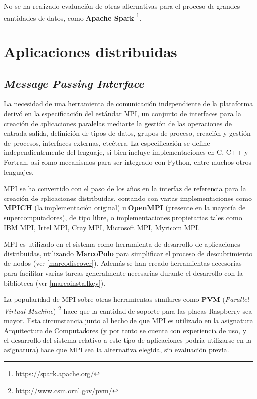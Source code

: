 No se ha realizado evaluación de otras alternativas para el proceso de grandes cantidades de datos, como \textbf{Apache Spark} \footnote{\href{https://spark.apache.org/}{https://spark.apache.org/}}.

\section{Aplicaciones distribuidas}

\subsection{\textit{Message Passing Interface}}

La necesidad de una herramienta de comunicación independiente de la plataforma derivó en la especificación del estándar MPI\cite{MPISpec}, un conjunto de interfaces para la creación de aplicaciones paralelas mediante la gestión de las operaciones de entrada-salida, definición de tipos de datos, grupos de proceso, creación y gestión de procesos, interfaces externas, etcétera. La especificación se define independientemente del lenguaje, si bien incluye implementaciones en C, C++ y Fortran, así como mecanismos para ser integrado con Python, entre muchos otros lenguajes.

MPI se ha convertido con el paso de los años en la interfaz de referencia para la creación de aplicaciones distribuidas, contando con varias implementaciones como \textbf{MPICH} (la implementación original) u \textbf{OpenMPI} (presente en la mayoría de supercomputadores), de tipo libre, o implementaciones propietarias tales como IBM MPI, Intel MPI, Cray MPI, Microsoft MPI, Myricom MPI.

MPI es utilizado en el sistema como herramienta de desarrollo de aplicaciones distribuidas, utilizando \textbf{MarcoPolo} para simplificar el proceso de descubrimiento de nodos (ver \ref{marcodiscover}). Además se han creado herramientas accesorias para facilitar varias tareas generalmente necesarias durante el desarrollo con la biblioteca (ver \ref{marcoinstallkey}).

La popularidad de MPI sobre otras herramientas similares como \textbf{PVM} (\textit{Parallel Virtual Machine}) \footnote{\href{http://www.csm.ornl.gov/pvm/}{http://www.csm.ornl.gov/pvm/}} hace que la cantidad de soporte para las placas Raspberry sea mayor. Esta circunstancia junto al hecho de que MPI es utilizado en la asignatura Arquitectura de Computadores (y por tanto se cuenta con experiencia de uso, y el desarrollo del sistema relativo a este tipo de aplicaciones podría utilizarse en la asignatura) hace que MPI sea la alternativa elegida, sin evaluación previa.

